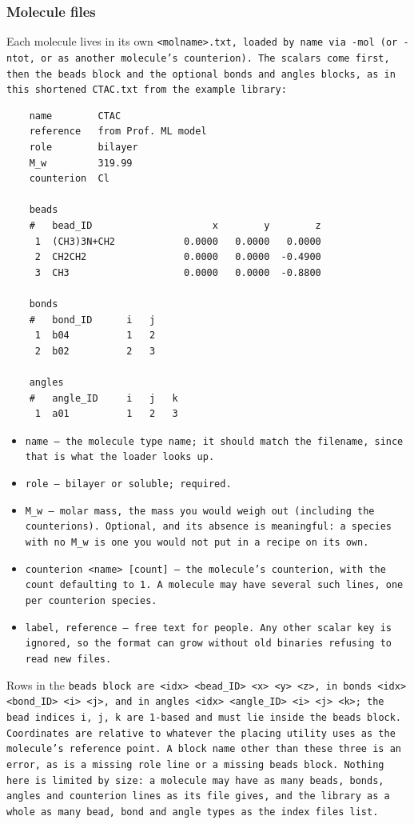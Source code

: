 \subsubsection*{Molecule files}

Each molecule lives in its own \tt{<molname>.txt}, loaded by name via
\tt{-mol} (or \tt{-ntot}, or as another molecule's counterion). The scalars
come first, then the \tt{beads} block and the optional \tt{bonds} and
\tt{angles} blocks, as in this shortened \tt{CTAC.txt} from the example
library:

\begin{verbatim}
    name        CTAC
    reference   from Prof. ML model
    role        bilayer
    M_w         319.99
    counterion  Cl

    beads
    #   bead_ID                     x        y        z
     1  (CH3)3N+CH2            0.0000   0.0000   0.0000
     2  CH2CH2                 0.0000   0.0000  -0.4900
     3  CH3                    0.0000   0.0000  -0.8800

    bonds
    #   bond_ID      i   j
     1  b04          1   2
     2  b02          2   3

    angles
    #   angle_ID     i   j   k
     1  a01          1   2   3
\end{verbatim}

\begin{itemize}[noitemsep]
  \item \tt{name} --- the molecule type name; it should match the filename,
    since that is what the loader looks up.
  \item \tt{role} --- \tt{bilayer} or \tt{soluble}; required.
  \item \tt{M_w} --- molar mass, the mass you would weigh out (including the
    counterions). Optional, and its absence is meaningful: a species with no
    \tt{M_w} is one you would not put in a recipe on its own.
  \item \tt{counterion <name> [count]} --- the molecule's counterion, with the
    count defaulting to 1. A molecule may have several such lines, one per
    counterion species.
  \item \tt{label}, \tt{reference} --- free text for people. Any other scalar
    key is ignored, so the format can grow without old binaries refusing to
    read new files.
\end{itemize}

Rows in the \tt{beads} block are \tt{<idx> <bead_ID> <x> <y> <z>}, in
\tt{bonds} \tt{<idx> <bond_ID> <i> <j>}, and in \tt{angles}
\tt{<idx> <angle_ID> <i> <j> <k>}; the bead indices \tt{i}, \tt{j}, \tt{k} are
1-based and must lie inside the \tt{beads} block. Coordinates are relative to
whatever the placing utility uses as the molecule's reference point. A block
name other than these three is an error, as is a missing \tt{role} line or a
missing \tt{beads} block. Nothing here is limited by size: a molecule may have
as many beads, bonds, angles and \tt{counterion} lines as its file gives, and
the library as a whole as many bead, bond and angle types as the index files
list.

